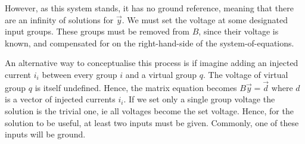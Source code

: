 \documentclass[11pt]{article}
\begin{document}
However, as this system stands, it has no ground reference, meaning that there are an infinity of solutions for $\vec y$. We must set the voltage at some designated input groups. These groups must be removed from $B$, since their voltage is known, and compensated for on the right-hand-side of the system-of-equations.

 An alternative way to conceptualise this process is if imagine adding an injected current $i_i$ between every group $i$ and a virtual group $q$. The voltage of virtual group $q$ is itself undefined. Hence, the matrix equation becomes $B\vec y=\vec d$ where $d$ is a vector of injected currents $i_i$. If we set only a single group voltage the solution is the trivial one, ie all voltages become the set voltage. Hence, for the solution to be useful, at least two inputs must be given. Commonly, one of these inputs will be ground.
\end{document}
